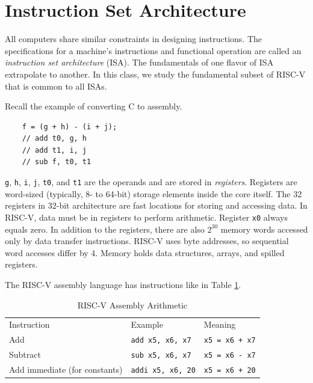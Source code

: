 \section{Instruction Set Architecture}

All computers share similar constraints in designing instructions.
The specifications for a machine's instructions and functional
operation are called an \emph{instruction set architecture} (ISA).
The fundamentals of one flavor of ISA extrapolate to another.
In this class, we study the fundamental subset of RISC-V that is common to all ISAs.

Recall the example of converting C to assembly.
\begin{lstlisting}
    f = (g + h) - (i + j);
    // add t0, g, h
    // add t1, i, j
    // sub f, t0, t1
\end{lstlisting}

\texttt{g}, \texttt{h}, \texttt{i}, \texttt{j}, \texttt{t0},
and \texttt{t1} are the operands and are stored in \emph{registers}.
Registers are word-sized (typically, 8- to 64-bit) storage
elements inside the core itself.
The 32 registers in 32-bit architecture
are fast locations for storing and
accessing data. In RISC-V, data must be
in registers to perform arithmetic. Register
\texttt{x0} always equals zero.
In addition to the registers, there
are also $2^{30}$ memory words accessed
only by data transfer instructions.
RISC-V uses byte addresses, so sequential
word accesses differ by 4. Memory holds
data structures, arrays, and spilled
registers.

The RISC-V assembly language has
instructions like in Table \ref{tab:riscvasmarithmetic}.
\begin{table}[h!]
    \begin{tabular}{lll}
        Instruction                   & Example                  & Meaning               \\
        Add                           & \texttt{add x5, x6, x7}  & \texttt{x5 = x6 + x7} \\
        Subtract                      & \texttt{sub x5, x6, x7}  & \texttt{x5 = x6 - x7} \\
        Add immediate (for constants) & \texttt{addi x5, x6, 20} & \texttt{x5 = x6 + 20}
    \end{tabular}
    \caption{RISC-V Assembly Arithmetic}
    \label{tab:riscvasmarithmetic}
\end{table}

